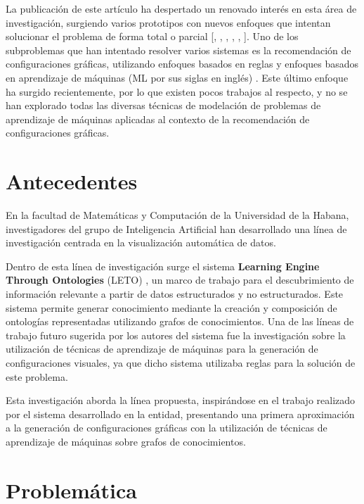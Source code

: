 La publicaci\'on de este art\'iculo ha despertado un renovado inter\'es en esta \'area de
investigaci\'on, surgiendo varios prototipos con nuevos enfoques que intentan solucionar
el problema de forma total o parcial 
[\cite*{luo2018deepeye}, \cite*{moritz2018draco}, \cite*{dibia2019data2vis}, \cite*{hu2019vizml}, \cite*{li2021kg4vis}, \cite*{harris2021insight}].
Uno de los subproblemas que han intentado resolver varios sistemas es la recomendaci\'on de configuraciones gr\'aficas, utilizando enfoques
basados en reglas y enfoques basados en aprendizaje de m\'aquinas (ML por sus siglas en ingl\'es) \cite{zeng2021we}. 
Este \'ultimo enfoque ha surgido recientemente, por lo que existen pocos trabajos al
respecto, y no se han explorado todas las diversas t\'ecnicas de modelaci\'on de problemas
de aprendizaje de m\'aquinas aplicadas al contexto de la recomendaci\'on de configuraciones gr\'aficas.


\section*{Antecedentes}
En la facultad de Matem\'aticas y Computaci\'on de la Universidad de la Habana,
investigadores del grupo de Inteligencia Artificial han desarrollado una l\'inea
de investigaci\'on centrada en la visualizaci\'on autom\'atica de datos.

Dentro de esta l\'inea de investigaci\'on surge el sistema \textbf{Learning Engine
Through Ontologies} (LETO) \cite{estevez2019demo}, un marco de trabajo para el descubrimiento
de informaci\'on relevante a partir de datos estructurados y no estructurados. Este
sistema permite generar conocimiento mediante la creaci\'on y composici\'on de ontolog\'ias 
representadas utilizando grafos de conocimientos. Una de las l\'ineas
de trabajo futuro sugerida por los autores del sistema fue la
investigaci\'on sobre la utilizaci\'on de t\'ecnicas
de aprendizaje de m\'aquinas para la generaci\'on de configuraciones visuales, ya que
dicho sistema utilizaba reglas para la soluci\'on de este problema.

Esta investigaci\'on aborda la l\'inea propuesta, inspir\'andose en el trabajo realizado
por el sistema desarrollado en la entidad, presentando una primera aproximaci\'on a la generaci\'on 
de configuraciones gr\'aficas con la utilizaci\'on de t\'ecnicas de aprendizaje de m\'aquinas sobre grafos
de conocimientos.


\section*{Problem\'atica}

